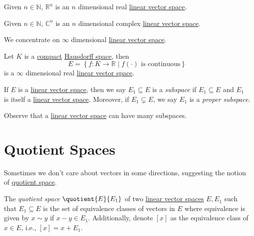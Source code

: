 \begin{eg}
	Given \(n\in \mathbb{N} \), \(\mathbb{R} ^n\) is an \(n\) dimensional real \hyperref[def:linear-vector-space]{linear vector space}.
\end{eg}

\begin{eg}
	Given \(n\in \mathbb{N} \), \(\mathbb{C} ^n\) is an \(n\) dimensional complex \hyperref[def:linear-vector-space]{linear vector space}.
\end{eg}

We concentrate on \(\infty \) dimensional \hyperref[def:linear-vector-space]{linear vector space}.

\begin{eg}
	Let \(K\) is a \hyperref[def:compact]{compact} \hyperref[def:Hausdorff]{Hausdorff space}, then
	\[
		E = \left\{ f\colon K\to \mathbb{R} \mid f(\cdot) \text{ is continuous}  \right\}
	\]
	is a \(\infty\) dimensional real \hyperref[def:linear-vector-space]{linear vector space}.
\end{eg}

\begin{notation}[Subspace]
	If \(E\) is a \hyperref[def:linear-vector-space]{linear vector space}, then we say \(E_1 \subseteq E\) is a \emph{subspace} if \(E_1 \subseteq E\) and \(E_1\) is itself a \hyperref[def:linear-vector-space]{linear vector space}. Moreover, if \(E_1 \subsetneq E\), we say \(E_1\) is a \emph{proper subspace}.
\end{notation}

Observe that a \hyperref[def:linear-vector-space]{linear vector space} can have many subspaces.

\section{Quotient Spaces}
Sometimes we don't care about vectors in some directions, suggesting the notion of \hyperref[def:quotient-space]{quotient space}.

\begin{definition}\label{def:quotient-space}
	The \emph{quotient space} \(\quotient{E}{E_1} \) of two \hyperref[def:linear-vector-space]{linear vector spaces} \(E, E_1\) such that \(E_1 \subseteq E\) is the set of equivalence classes of vectors in \(E\) where equivalence is given by \(x\sim y\) if \(x - y\in E_1\). Additionally, denote \([x]\) as the equivalence class of \(x\in E\), i.e., \([x] = x + E_1\).
\end{definition}

